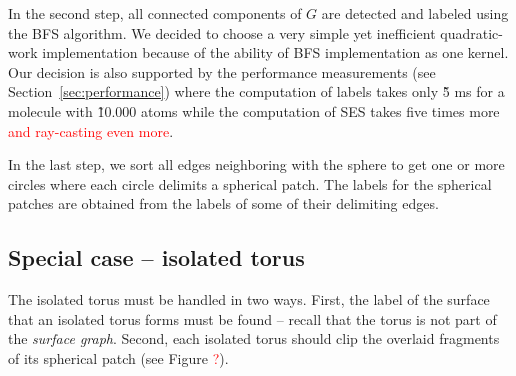 In the second step, all connected components of $G$ are detected and labeled using the BFS algorithm.
We decided to choose a very simple yet inefficient \cite{merrill2012scalable} quadratic-work implementation because of the ability of BFS implementation as one kernel.
Our decision is also supported by the performance measurements (see Section~\ref{sec:performance}) where the computation of labels takes only \~5 ms for a molecule with \~10.000 atoms while the computation of SES takes five times more \textcolor{red}{and ray-casting even more}.

In the last step, we sort all edges neighboring with the sphere to get one or more circles where each circle delimits a spherical patch.
The labels for the spherical patches are obtained from the labels of some of their delimiting edges.

\subsection{Special case -- isolated torus}

The isolated torus must be handled in two ways.
First, the label of the surface that an isolated torus forms must be found -- recall that the torus is not part of the \textit{surface graph}.
Second, each isolated torus should clip the overlaid fragments of its spherical patch (see Figure \textcolor{red}{?}).


